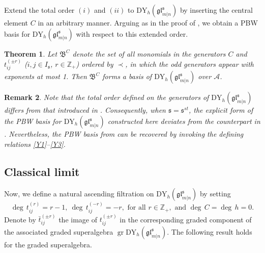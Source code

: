 \documentclass[a4paper,12pt]{article}
\newtheorem{theo}{{Theorem}}[section]
\newtheorem{rema}[theo]{Remark}
\numberwithin{equation}{section}
\begin{document}
Extend the total order $(i)$ and $(ii)$ to $\mathrm{DY}_{h}(\mathfrak{gl}^{\mathfrak{s}}_{m|n})$ by inserting the central element $C$ in an arbitrary manner. Arguing as in the proof of \cite[Theorem 2.9]{BK25-2}, we obtain a PBW basis for $\mathrm{DY}_{h}(\mathfrak{gl}^{\mathfrak{s}}_{m|n})$ with respect to this extended order.

\begin{theo}\label{PBW basis}
Let $\mathfrak{B}^C$ denote the set of all monomials
in the generators $C$ and $t_{ij}^{(\pm r)}$ ($i,j\in I_{\mathfrak{s}}$, $r\in\mathbb{Z}_+$) ordered by $\prec$, in which the odd generators appear with exponents at most 1. Then $\mathfrak{B}^C$ forms a basis of $\mathrm{DY}_{h}(\mathfrak{gl}^{\mathfrak{s}}_{m|n})$ over $\mathcal{A}$.
\end{theo}

\begin{rema}
Note that the total order defined on the generators of $\mathrm{DY}_{h}(\mathfrak{gl}^{\mathfrak{s}}_{m|n})$ differs from that introduced in \cite{BK25-2}. Consequently, when $\mathfrak{s}=\mathfrak{s}^{st}$, the explicit form of the PBW basis for $\mathrm{DY}_{h}(\mathfrak{gl}^{\mathfrak{s}}_{m|n})$ constructed here deviates from the counterpart in \cite{BK25-2}. Nevertheless, the PBW basis from \cite{BK25-2} can be recovered by invoking the defining relations \eqref{Y1}–\eqref{Y3}.
\end{rema}


\subsection{Classical limit}
Now, we define a natural ascending filtration on $\mathrm{DY}_{h}(\mathfrak{gl}^{\mathfrak{s}}_{m|n})$ by setting
$$
\operatorname{deg}\,t_{ij}^{(r)}=r-1,~\operatorname{deg}\,t_{ij}^{(-r)}=-r, \text{ for all } r\in\mathbb{Z}_{+}, \text{ and } \operatorname{deg}\,C=\operatorname{deg}\,h=0.
$$
Denote by $\bar{t}_{ij}^{(\pm r)}$ the image of $t_{ij}^{(\pm r)}$ in the corresponding graded component of the associated graded superalgebra
$\operatorname{gr} \mathrm{DY}_{h}(\mathfrak{gl}^{\mathfrak{s}}_{m|n})$.
The following result holds for the graded superalgebra.
\end{document}
